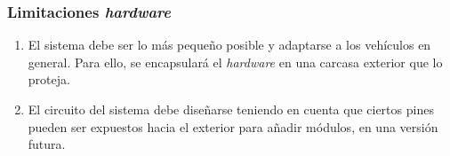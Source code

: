 \subsubsection{Limitaciones \textit{hardware}}
\begin{enumerate}[resume, label=\textbf{\texttt{RNF-\arabic*}}]
  \item\label{nf:exterior} El sistema debe ser lo más pequeño posible y adaptarse
  a los vehículos en general. Para ello, se encapsulará el \textit{hardware} en
  una carcasa exterior que lo proteja.
  \item\label{nf:circuit} El circuito del sistema debe diseñarse teniendo en cuenta
  que ciertos pines pueden ser expuestos hacia el exterior para añadir módulos, en
  una versión futura.
\end{enumerate}